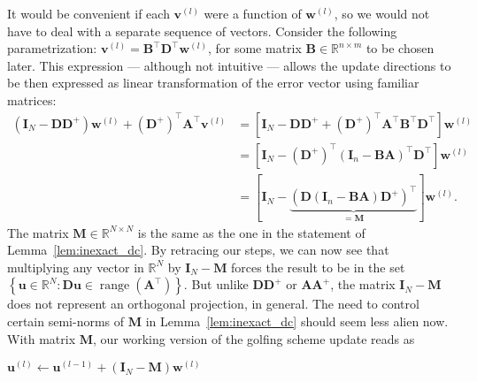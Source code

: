 It would be convenient if each $\mathbf{v}^{(l)}$ were a function of $\mathbf{w}^{(l)}$, so we would not have to deal with a separate sequence of vectors. Consider the following parametrization: $\mathbf{v}^{(l)} = \mathbf{B}^\top \mathbf{D}^{\top}\mathbf{w}^{(l)}$, for some matrix $\mathbf{B} \in \mathbb{R}^{n \times m}$ to be chosen later. This expression --- although not intuitive --- allows the update directions to be then expressed as linear transformation of the error vector using familiar matrices:
\begin{align*}
    \left ( \mathbf{I}_N - \mathbf{D} \mathbf{D}^{+}\right ) \mathbf{w}^{(l)} + (\mathbf{D}^{+})^{\top}\mathbf{A}^{\top} \mathbf{v}^{(l)} & = \left [ \mathbf{I}_N - \mathbf{D} \mathbf{D}^{+} + (\mathbf{D}^{+})^{\top}\mathbf{A}^{\top} \mathbf{B}^\top \mathbf{D}^{\top} \right ] \mathbf{w}^{(l)}\\
    & = \left [ \mathbf{I}_N - (\mathbf{D}^{+})^{\top} \left (\mathbf{I}_n - \mathbf{B} \mathbf{A} \right)^{\top} \mathbf{D}^{\top} \right ] \mathbf{w}^{(l)}\\
    & = \left [ \mathbf{I}_N - \underbrace{\left ( \mathbf{D} \left (\mathbf{I}_n - \mathbf{B} \mathbf{A} \right) \mathbf{D}^{+} \right)^{\top}}_{= \mathbf{M}} \right ] \mathbf{w}^{(l)}.
\end{align*}
The matrix $\mathbf{M} \in \mathbb{R}^{N \times N}$ is the same as the one in the statement of Lemma~\ref{lem:inexact_dc}. By retracing our steps, we can now see that multiplying any vector in $\mathbb{R}^{N}$ by $\mathbf{I}_N - \mathbf{M}$ forces the result to be in the set $\left\{\mathbf{u} \in \mathbb{R}^{N} : \mathbf{D} \mathbf{u} \in \operatorname{range} \left ( \mathbf{A^{\top}} \right ) \right\}$. But unlike $\mathbf{D} \mathbf{D}^{+}$ or $\mathbf{A} \mathbf{A}^{+}$, the matrix $\mathbf{I}_N - \mathbf{M}$ does not represent an orthogonal projection, in general. The need to control certain semi-norms of $\mathbf{M}$ in Lemma~\ref{lem:inexact_dc} should seem less alien now. With matrix $\mathbf{M}$, our working version of the golfing scheme update reads as
\begin{algorithm}[H]
    \begin{algorithmic}[1]
        \State{$\ldots$}
        \State $\mathbf{u}^{(l)} \gets \mathbf{u}^{(l-1)} + \left ( \mathbf{I}_N - \mathbf{M} \right ) \mathbf{w}^{(l)}$
        \State{$\ldots$}
    \end{algorithmic}
\end{algorithm}

